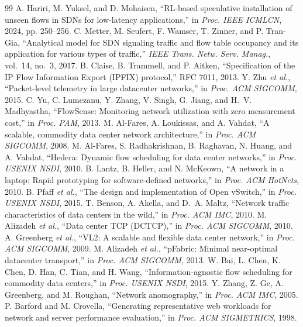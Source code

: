 \documentclass[conference]{IEEEtran}
\begin{document}
\begin{thebibliography}{99}
 A. Hariri, M. Yuksel, and D. Mohaisen, ``RL-based speculative installation of unseen flows in SDNs for low-latency applications,'' in \emph{Proc. IEEE ICMLCN}, 2024, pp. 250--256.
 C. Metter, M. Seufert, F. Wamser, T. Zinner, and P. Tran-Gia, ``Analytical model for SDN signaling traffic and flow table occupancy and its application for various types of traffic,'' \emph{IEEE Trans. Netw. Serv. Manag.}, vol.~14, no.~3, 2017.
 B. Claise, B. Trammell, and P. Aitken, ``Specification of the IP Flow Information Export (IPFIX) protocol,'' RFC 7011, 2013.
 Y. Zhu \emph{et al.}, ``Packet-level telemetry in large datacenter networks,'' in \emph{Proc. ACM SIGCOMM}, 2015.
 C. Yu, C. Lumezanu, Y. Zhang, V. Singh, G. Jiang, and H.~V. Madhyastha, ``FlowSense: Monitoring network utilization with zero measurement cost,'' in \emph{Proc. PAM}, 2013.
 M. Al-Fares, A. Loukissas, and A. Vahdat, ``A scalable, commodity data center network architecture,'' in \emph{Proc. ACM SIGCOMM}, 2008.
 M. Al-Fares, S. Radhakrishnan, B. Raghavan, N. Huang, and A. Vahdat, ``Hedera: Dynamic flow scheduling for data center networks,'' in \emph{Proc. USENIX NSDI}, 2010.
 B. Lantz, B. Heller, and N. McKeown, ``A network in a laptop: Rapid prototyping for software-defined networks,'' in \emph{Proc. ACM HotNets}, 2010.
 B. Pfaff \emph{et al.}, ``The design and implementation of Open vSwitch,'' in \emph{Proc. USENIX NSDI}, 2015.
 T. Benson, A. Akella, and D.~A. Maltz, ``Network traffic characteristics of data centers in the wild,'' in \emph{Proc. ACM IMC}, 2010.
 M. Alizadeh \emph{et al.}, ``Data center TCP (DCTCP),'' in \emph{Proc. ACM SIGCOMM}, 2010.
 A. Greenberg \emph{et al.}, ``VL2: A scalable and flexible data center network,'' in \emph{Proc. ACM SIGCOMM}, 2009.
 M. Alizadeh \emph{et al.}, ``pFabric: Minimal near-optimal datacenter transport,'' in \emph{Proc. ACM SIGCOMM}, 2013.
 W. Bai, L. Chen, K. Chen, D. Han, C. Tian, and H. Wang, ``Information-agnostic flow scheduling for commodity data centers,'' in \emph{Proc. USENIX NSDI}, 2015.
 Y. Zhang, Z. Ge, A. Greenberg, and M. Roughan, ``Network anomography,'' in \emph{Proc. ACM IMC}, 2005.
 P. Barford and M. Crovella, ``Generating representative web workloads for network and server performance evaluation,'' in \emph{Proc. ACM SIGMETRICS}, 1998.
\end{thebibliography}
\end{document}
